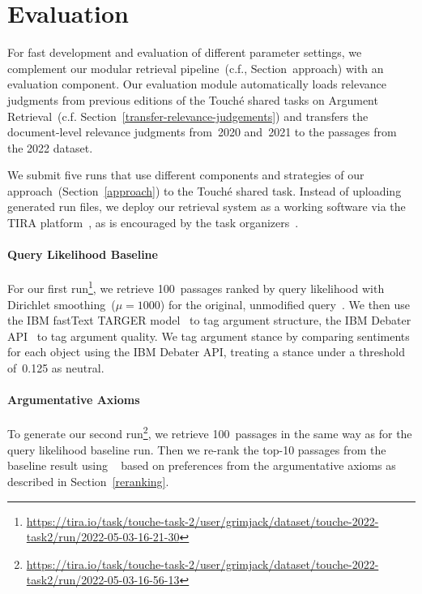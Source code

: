 \section{Evaluation}
\label{evaluation}

For fast development and evaluation of different parameter settings, we complement our modular retrieval pipeline~(c.f., Section~\refname{approach}) with an evaluation component. Our evaluation module automatically loads relevance judgments from previous editions of the Touché shared tasks on Argument Retrieval~(c.f. Section~\ref{transfer-relevance-judgements}) and transfers the document-level relevance judgments from~2020 and~2021 to the passages from the 2022 dataset.

We submit five runs that use different components and strategies of our approach~(Section~\ref{approach}) to the Touché shared task.
Instead of uploading generated run files, we deploy our retrieval system as a working software via the TIRA platform~\cite{PotthastGWS2019}, as is encouraged by the task organizers~\cite{BondarenkoFKSGBPBSWPH2022}.

\paragraph{Query Likelihood Baseline}

For our first run\footnote{\url{https://tira.io/task/touche-task-2/user/grimjack/dataset/touche-2022-task2/run/2022-05-03-16-21-30}}, we retrieve 100~passages ranked by query likelihood with Dirichlet smoothing~(\(\mu = 1000\)) for the original, unmodified query~\cite{ZhaiL2001}. We then use the IBM fastText TARGER model~\cite{ChernodubOHBHBP2019} to tag argument structure,
the IBM Debater API~\cite{ToledoGCFVLJAS2019} to tag argument quality.
We tag argument stance by comparing sentiments for each object using the IBM Debater API, treating a stance under a threshold of~0.125 as neutral.

\paragraph{Argumentative Axioms}

To generate our second run\footnote{\url{https://tira.io/task/touche-task-2/user/grimjack/dataset/touche-2022-task2/run/2022-05-03-16-56-13}}, we retrieve 100~passages in the same way as for the query likelihood baseline run. Then we re-rank the top-10 passages from the baseline result using \KwikSort~\cite{BondarenkoFRSVH2022,HagenVGS2016} based on preferences from the argumentative axioms as described in Section~\ref{reranking}.

